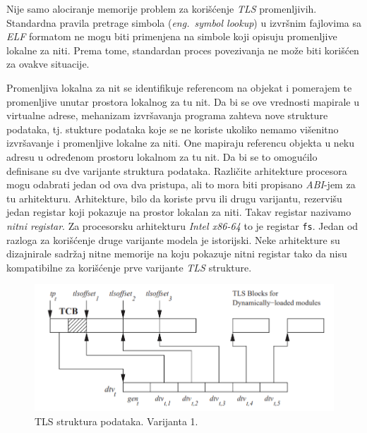 \documentclass[12pt,oneside]{memoir}
\begin{document}
Nije samo alociranje memorije problem za korišćenje \emph{TLS} promenljivih. Standardna pravila pretrage simbola (\emph{eng.~symbol lookup}) u izvršnim fajlovima sa \emph{ELF} formatom ne mogu biti primenjena na simbole koji opisuju promenljive lokalne za niti. Prema tome, standardan proces povezivanja ne može biti korišćen za ovakve situacije.

Promenljiva lokalna za nit se identifikuje referencom na objekat i pomerajem te promenljive unutar prostora lokalnog za tu nit. Da bi se ove vrednosti mapirale u virtualne adrese, mehanizam izvršavanja programa zahteva nove strukture podataka, tj. stukture podataka koje se ne koriste ukoliko nemamo višenitno izvršavanje i promenljive lokalne za niti. One mapiraju referencu objekta u neku adresu u određenom prostoru lokalnom za tu nit. Da bi se to omogućilo definisane su dve varijante struktura podataka. Različite arhitekture procesora mogu odabrati jedan od ova dva pristupa, ali to mora biti propisano \emph{ABI}-jem za tu arhitekturu. Arhitekture, bilo da koriste prvu ili drugu varijantu, rezervišu jedan registar koji pokazuje na prostor lokalan za niti. Takav registar nazivamo \emph{nitni registar}. Za procesorsku arhitekturu \emph{Intel x86-64} to je registar \texttt{fs}. Jedan od razloga za korišćenje druge varijante modela je istorijski. Neke arhitekture su dizajnirale sadržaj nitne memorije na koju pokazuje nitni registar tako da nisu kompatibilne za korišćenje prve varijante \emph{TLS} strukture.

\begin{figure}[h!]
	\begin{center}
		\includegraphics[scale=0.6]{slike/TLSModelV1.png}
	\end{center}
	\caption{TLS struktura podataka. Varijanta 1.}
	\label{fig:tls_model1}
\end{figure}
\end{document}
